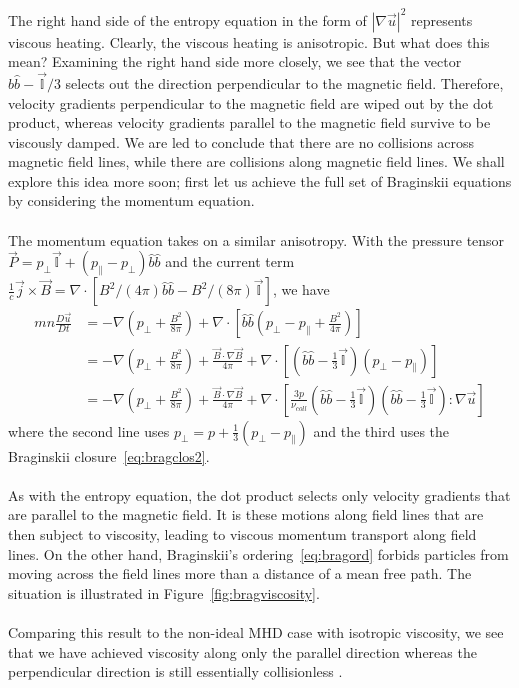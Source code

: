 The right hand side of the entropy equation in the form of $|\nabla\vec u|^2$ represents viscous heating. Clearly, the viscous heating is anisotropic. But what does this mean? Examining the right hand side more closely, we see that the vector $\hat b\hat b-\vec{\mathbb{I}}/3$ selects out the direction perpendicular to the magnetic field. Therefore, velocity gradients perpendicular to the magnetic field are wiped out by the dot product, whereas velocity gradients parallel to the magnetic field survive to be viscously damped. We are led to conclude that there are no collisions across magnetic field lines, while there are collisions along magnetic field lines. We shall explore this idea more soon; first let us achieve the full set of Braginskii equations by considering the momentum equation. \\
\\
The momentum equation takes on a similar anisotropy. With the pressure tensor $\vec P=p_\perp\vec{\mathbb{I}}+(p_\parallel-p_\perp)\hat b\hat b$ and the current term $\frac1c\vec j\times\vec B=\nabla\cdot\left[B^2/(4\pi)\hat b\hat b-B^2/(8\pi)\vec{\mathbb{I}}\right]$, we have
\begin{align*}
  mn\frac{D\vec u}{Dt}&=-\nabla\left(p_\perp+\frac{B^2}{8\pi}\right)+\nabla\cdot\left[\hat b\hat b\left(p_\perp-p_\parallel+\frac{B^2}{4\pi}\right)\right]\\
  &=-\nabla\left(p_\perp+\frac{B^2}{8\pi}\right)+\frac{\vec B\cdot\nabla\vec B}{4\pi}+\nabla\cdot\left[\left(\hat b\hat b-\frac13\vec{\mathbb{I}}\right)(p_\perp-p_\parallel)\right]\\
  &=-\nabla\left(p_\perp+\frac{B^2}{8\pi}\right)+\frac{\vec B\cdot\nabla\vec B}{4\pi}+\nabla\cdot\left[\frac{3p}{\nu_{coll}}\left(\hat b\hat b-\frac13\vec{\mathbb{I}}\right)\left(\hat b\hat b-\frac13\vec{\mathbb{I}}\right):\nabla\vec u\right]
\end{align*}
where the second line uses $p_\perp=p+\frac13(p_\perp-p_\parallel)$ and the third uses the Braginskii closure~\ref{eq:bragclos2}.\\
\\
As with the entropy equation, the dot product selects only velocity gradients that are parallel to the magnetic field. It is these motions along field lines that are then subject to viscosity, leading to viscous momentum transport along field lines. On the other hand, Braginskii's ordering~\ref{eq:bragord} forbids particles from moving across the field lines more than a distance of a mean free path. The situation is illustrated in Figure~\ref{fig:bragviscosity}.\\
\\
Comparing this result to the non-ideal MHD case with isotropic viscosity, we see that we have achieved viscosity along only the parallel direction whereas the perpendicular direction is still essentially collisionless .

